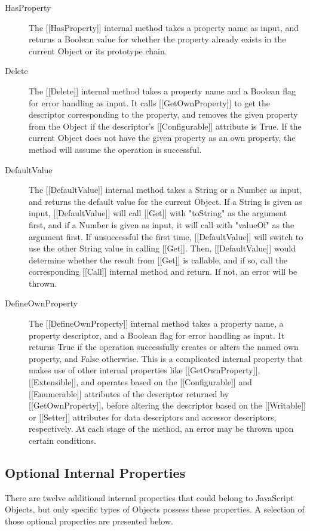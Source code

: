 \documentclass[a4paper,11pt,twoside]{report}
\begin{document}
\begin{description}
\item[HasProperty] The [[HasProperty]] internal method takes a property name as input, and returns a Boolean value for whether the property already exists in the current Object or its prototype chain.

\item[Delete] The [[Delete]] internal method takes a property name and a Boolean flag for error handling as input. It calls [[GetOwnProperty]] to get the descriptor corresponding to the property, and removes the given property from the Object if the descriptor's [[Configurable]] attribute is True. If the current Object does not have the given property as an own property, the method will assume the operation is successful.

\item[DefaultValue] The [[DefaultValue]] internal method takes a String or a Number as input, and returns the default value for the current Object. If a String is given as input, [[DefaultValue]] will call [[Get]] with "toString" as the argument first, and if a Number is given as input, it will call with "valueOf" as the argument first. If unsuccessful the first time, [[DefaultValue]] will switch to use the other String value in calling [[Get]]. Then, [[DefaultValue]] would determine whether the result from [[Get]] is callable, and if so, call the corresponding [[Call]] internal method and return. If not, an error will be thrown.

\item[DefineOwnProperty] The [[DefineOwnProperty]] internal method takes a property name, a property descriptor, and a Boolean flag for error handling as input. It returns True if the operation successfully creates or alters the named own property, and False otherwise. This is a complicated internal property that makes use of other internal properties like [[GetOwnProperty]], [[Extensible]], and operates based on the [[Configurable]] and [[Enumerable]] attributes of the descriptor returned by [[GetOwnProperty]], before altering the descriptor based on the [[Writable]] or [[Setter]] attributes for data descriptors and accessor descriptors, respectively. At each stage of the method, an error may be thrown upon certain conditions.
\end{description}

\subsection{Optional Internal Properties}
There are twelve additional internal properties that could belong to JavaScript Objects, but only specific types of Objects possess these properties. A selection of those optional properties are presented below.
\end{document}
